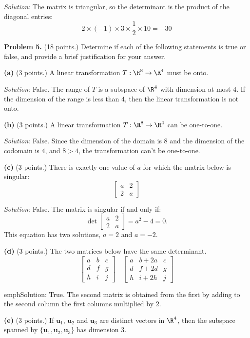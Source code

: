 \documentclass[12pt]{article}
\begin{document}
\emph{Solution}: The matrix is triangular, so the determinant is the product of the diagonal entries:
\[
2\times(-1)\times3\times\frac{1}{2}\times10=-30
\]
\proofend

\textbf{Problem 5.} (18 points.) Determine if each of the following statements is true or false, and provide a brief justification for your answer.

\textbf{(a)} (3 points.) A linear transformation $T:\R^8\to\R^4$ must be onto.

\emph{Solution}: False. The range of $T$ is a subspace of $\R^4$ with dimension at most $4$. If the dimension of the range is less than $4$, then the linear transformation is not onto.

\textbf{(b)} (3 points.) A linear transformation $T:\R^8\to\R^4$ can be one-to-one.
\proofend

\emph{Solution}: False. Since the dimension of the domain is $8$ and the dimension of the codomain is $4$, and $8>4$, the transformation can't be one-to-one. 
\proofend

\textbf{(c)} (3 points.) There is exactly one value of $a$ for which the matrix below is singular:
\[
\begin{bmatrix}a&2\\2&a\end{bmatrix}
\]

\emph{Solution}: False. The matrix is singular if and only if:
\[
\det\begin{bmatrix}a&2\\2&a\end{bmatrix}=a^2-4=0.
\]
This equation has two solutions, $a=2$ and $a=-2$.
\proofend

\textbf{(d)} (3 points.) The two matrices below have the same determinant.
\[
\begin{bmatrix}a&b&c\\d&f&g\\h&i&j\end{bmatrix}\quad
\begin{bmatrix}a&b+2a&c\\d&f+2d&g\\h&i+2h&j\end{bmatrix}
\]

emph{Solution}: True. The second matrix is obtained from the first by adding to the second column the first columns multiplied by $2$.
\proofend

\textbf{(e)} (3 points.) If $\mathbf{u}_1$, $\mathbf{u}_2$ and $\mathbf{u}_3$ are distinct vectors in $\R^4$, then the subspace spanned by $\{\mathbf{u}_1,\mathbf{u}_2,\mathbf{u}_3\}$ has dimension 3.
\end{document}
